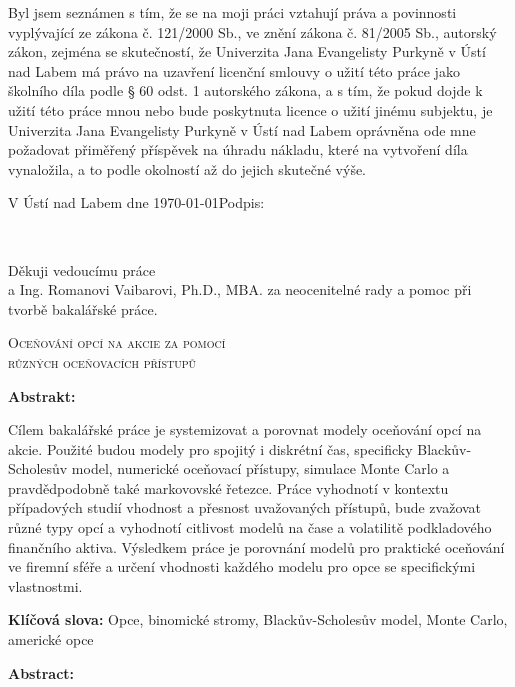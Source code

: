 \documentclass[male,czech,api_bc]{kitheses}
\newcommand{\ZT}[1]{\colorbox{yellow}{\color{red}{#1}}}
\newcommand{\nazevcz}{Oceňování opcí na akcie za pomocí \\ různých oceňovacích přístupů}        %
\newcommand{\nazeven}{\ZT{Valuation of stock options by using \\ various valuation approaches}}     %
\newcommand{\vedouciDAT}{\ZT{doc. PhDr. Ing. Martinu Boďovi, DrSc.}}
\begin{document}
\vspace{0.5em}

Byl jsem seznámen 
s tím, že se na moji práci vztahují práva a povinnosti vyplývající ze
zákona č. 121/2000 Sb., ve znění zákona č. 81/2005 Sb., autorský zákon, zejména se
skutečností, že Univerzita Jana Evangelisty Purkyně v Ústí nad Labem má právo na uzavření
licenční smlouvy o užití této práce jako školního díla podle § 60 odst. 1 autorského zákona, a
s tím, že pokud dojde k užití této práce mnou nebo bude poskytnuta licence o užití jinému
subjektu, je Univerzita Jana Evangelisty Purkyně v Ústí nad Labem oprávněna ode mne
požadovat přiměřený příspěvek na úhradu nákladu, které na vytvoření díla vynaložila, a to
podle okolností až do jejich skutečné výše.

\vspace{2em}

V Ústí nad Labem dne \today   \hfill Podpis: \makebox[4cm][s]{\dotfill}

\cleardoublepage
\thispagestyle{empty}
~
\vfill

\begin{flushright}
    Děkuji vedoucímu práce \ZT{\vedouciDAT}\\ a Ing. Romanovi Vaibarovi, Ph.D., MBA.
    za neocenitelné rady a pomoc při tvorbě bakalářské práce.
\end{flushright}

\cleardoublepage

\textsc{\nazevcz}

\textbf{Abstrakt:}

Cílem bakalářské práce je systemizovat a porovnat modely oceňování opcí na akcie. Použité budou modely pro spojitý i diskrétní čas, specificky Blackův-Scholesův model, numerické oceňovací přístupy, simulace Monte Carlo a pravdědpodobně také markovovské řetezce. Práce vyhodnotí v kontextu případových studií vhodnost a přesnost uvažovaných přístupů, bude zvažovat různé typy opcí a vyhodnotí citlivost modelů na čase a volatilitě podkladového finančního aktiva. Výsledkem práce je porovnání modelů pro praktické oceňování ve firemní sféře a určení vhodnosti každého modelu pro opce se specifickými vlastnostmi.

\textbf{Klíčová slova:} Opce, binomické stromy, Blackův-Scholesův model, Monte Carlo, americké opce

\bigskip


\textsc{\nazeven}

\textbf{Abstract:}
\end{document}
